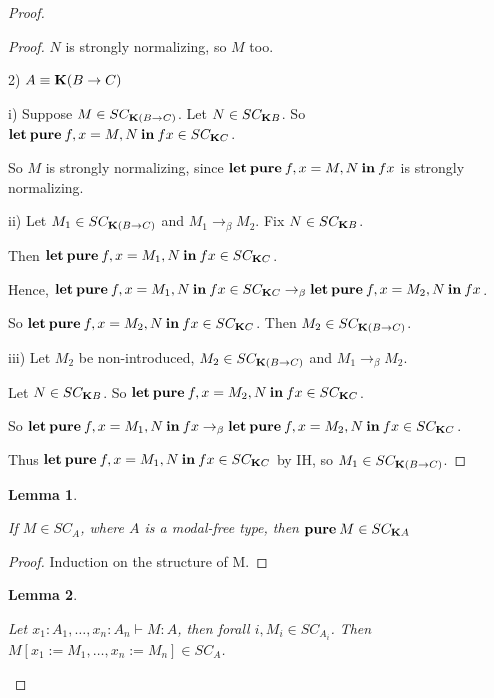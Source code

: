 \documentclass[a4paper]{article}
\newtheorem{lemma}{Lemma}
\begin{document}
\begin{proof}
\begin{proof}
  $N$ is strongly normalizing, so $M$ too.

    \vspace{\baselineskip}

  2) $A \equiv {\bf K}(B \to C)$

  i) Suppose $M \in SC_{{\bf K}(B \to C)}$. Let $N \in SC_{{\bf K}B}$. So ${\bf let \: pure \:} f, x = M, N {\: \bf in \: } f x \in SC_{{\bf K}C}$.

  So $M$ is strongly normalizing, since ${\bf let \: pure \:} f, x = M, N {\: \bf in \: } f x$ is strongly normalizing.

  ii) Let $M_1 \in SC_{{\bf K}(B \to C)}$ and $M_1 \rightarrow_{\beta} M_2$. Fix $N \in SC_{{\bf K}B}$.

  Then ${\bf let \: pure \:} f, x = M_1, N {\: \bf in \: } f x \in SC_{{\bf K}C}$.

  Hence, ${\bf let \: pure \:} f, x = M_1, N {\: \bf in \: } f x \in SC_{{\bf K}C} \rightarrow_{\beta} {\bf let \: pure \:} f, x = M_2, N {\: \bf in \: } f x$.

  So ${\bf let \: pure \:} f, x = M_2, N {\: \bf in \: } f x \in SC_{{\bf K}C}$. Then $M_2 \in SC_{{\bf K}(B \to C)}$.

  iii) Let $M_2$ be non-introduced, $M_2 \in SC_{{\bf K}(B \to C)}$ and $M_1 \rightarrow_{\beta} M_2$.

  Let $N \in SC_{{\bf K}B}$. So ${\bf let \: pure \:} f, x = M_2, N {\: \bf in \:} f x \in SC_{{\bf K}C}$.

  So ${\bf let \: pure \:} f, x = M_1, N {\: \bf in \:} f x \rightarrow_{\beta} {\bf let \: pure \:} f, x = M_2, N {\: \bf in \:} f x \in SC_{{\bf K}C}$.

  Thus ${\bf let \: pure \:} f, x = M_1, N {\: \bf in \:} f x \in SC_{{\bf K}C}$ by IH, so $M_1 \in SC_{{\bf K}(B \to C)}$.
\end{proof}

\begin{lemma}
  $ $

  If $M \in SC_A$, where $A$ is a modal-free type, then ${\bf pure \:} M \in SC_{{\bf K}A}$
\end{lemma}

\begin{proof}

  Induction on the structure of M.
\end{proof}

\begin{lemma}
  $ $

  Let $x_1 : A_1,\dots, x_n : A_n \vdash M : A$, then forall $i, M_i \in SC_{A_i}$. Then $M [x_1 := M_1,\dots,x_n := M_n] \in SC_A$.
\end{lemma}


\end{proof}
\end{document}
